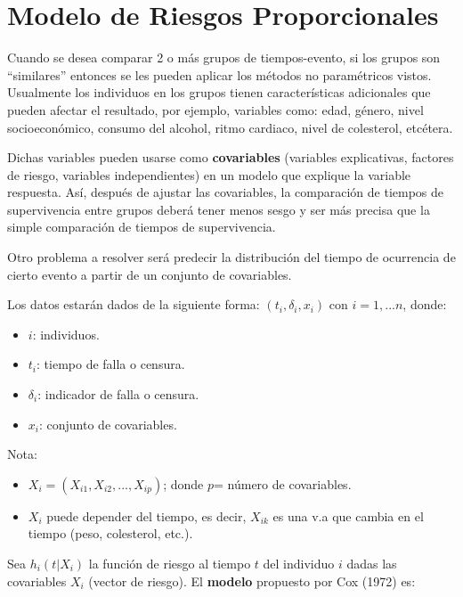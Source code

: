 \documentclass[
  a4paper,
  oneside,
  openany]{book}
\providecommand{\tightlist}{%
  \setlength{\itemsep}{0pt}\setlength{\parskip}{0pt}}
\begin{document}
\hypertarget{modelo-de-riesgos-proporcionales}{%
\chapter{Modelo de Riesgos Proporcionales}\label{modelo-de-riesgos-proporcionales}}

Cuando se desea comparar 2 o más grupos de tiempos-evento, si los grupos son ``similares'' entonces se les pueden aplicar los métodos no paramétricos vistos. Usualmente los individuos en los grupos tienen características adicionales que pueden afectar el resultado, por ejemplo, variables como: edad, género, nivel socioeconómico, consumo del alcohol, ritmo cardiaco, nivel de colesterol, etcétera.

Dichas variables pueden usarse como \textbf{covariables} (variables explicativas, factores de riesgo, variables independientes) en un modelo que explique la variable respuesta. Así, después de ajustar las covariables, la comparación de tiempos de supervivencia entre grupos deberá tener menos sesgo y ser más precisa que la simple comparación de tiempos de supervivencia.

Otro problema a resolver será predecir la distribución del tiempo de ocurrencia de cierto evento a partir de un conjunto de covariables.

Los datos estarán dados de la siguiente forma: \((t_i, \delta_i,x_i)\) con \(i = 1,...n\), donde:

\begin{itemize}
\tightlist
\item
  \(i\): individuos.
\item
  \(t_i\): tiempo de falla o censura.
\item
  \(\delta_i\): indicador de falla o censura.
\item
  \(x_i\): conjunto de covariables.
\end{itemize}

Nota:

\begin{itemize}
\tightlist
\item
  \(X_i =(X_{i1}, X_{i2}, ..., X_{ip})\); donde \(p\)= número de covariables.
\item
  \(X_i\) puede depender del tiempo, es decir, \(X_{ik}\) es una v.a que cambia en el tiempo (peso, colesterol, etc.).
\end{itemize}

Sea \(h_i(t|X_i)\) la función de riesgo al tiempo \(t\) del individuo \(i\) dadas las covariables \(X_i\) (vector de riesgo). El \textbf{modelo} propuesto por Cox (1972) es:
\end{document}
